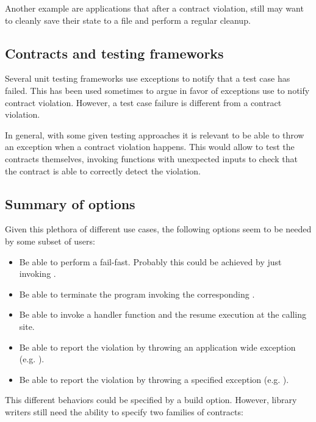 Another example are applications that after a contract violation, still may want
to cleanly save their state to a file and perform a regular cleanup.

\subsection{Contracts and testing frameworks}

Several unit testing frameworks use exceptions to notify that a test case has
failed. This has been used sometimes to argue in favor of exceptions use to
notify contract violation. However, a test case failure is different from a
contract violation.

In general, with some given testing approaches it is relevant to be able to
throw an exception when a contract violation happens. This would allow to test
the contracts themselves, invoking functions with unexpected inputs to check
that the contract is able to correctly detect the violation.

\subsection{Summary of options}

Given this plethora of different use cases, the following options seem to be
needed by some subset of users:

\begin{itemize}
  \item Be able to perform a fail-fast. Probably this could be achieved by just
invoking .
  \item Be able to terminate the program invoking the corresponding
.
  \item Be able to invoke a handler function and the resume execution at the
calling site.
  \item Be able to report the violation by throwing an application wide
exception (e.g. ).
  \item Be able to report the violation by throwing a specified exception (e.g.
).
\end{itemize}

This different behaviors could be specified by a build option. However, library
writers still need the ability to specify two families of contracts:

